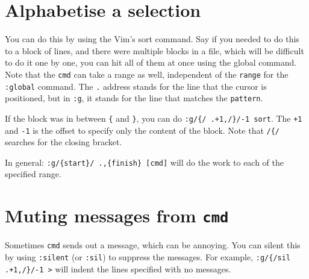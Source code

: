 \section{Alphabetise a selection}

You can do this by using the Vim's sort command.
Say if you needed to do this to a block of lines, and there were multiple blocks in a file, which will be difficult to do it one by one, you can hit all of them at once using the global command.
Note that the \verb|cmd| can take a range as well, independent of the \verb|range| for the \verb|:global| command.
The \verb|.| address stands for the line that the cursor is positioned, but in \verb|:g|, it stands for the line that matches the \verb|pattern|.

If the block was in between \verb|{| and \verb|}|, you can do \verb|:g/{/ .+1,/}/-1 sort|.
The \verb|+1| and \verb|-1| is the offset to specify only the content of the block.
Note that \verb|/{/| searches for the closing bracket.

In general: \verb|:g/{start}/ .,{finish} [cmd]| will do the work to each of the specified range.

\section{Muting messages from \texttt{cmd}}

Sometimes \verb|cmd| sends out a message, which can be annoying.
You can silent this by using \verb|:silent| (or \verb|:sil|) to suppress the messages.
For example, \verb|:g/{/sil .+1,/}/-1 >| will indent the lines specified with no messages.
